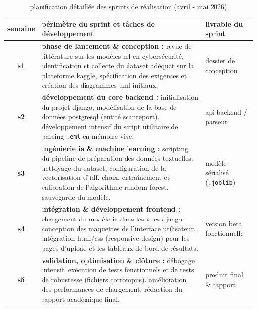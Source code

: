 \documentclass[12pt,a4paper]{report}
\begin{document}
\begin{table}[h]
\centering
\caption{planification détaillée des sprints de réalisation (avril - mai 2026)}
\begin{tabularx}{\textwidth}{|c|x|l|}
\hline
\textbf{semaine} & \textbf{périmètre du sprint et tâches de développement} & \textbf{livrable du sprint} \\ \hline
\textbf{s1} & \textbf{phase de lancement \& conception :} revue de littérature sur les modèles ml en cybersécurité, identification et collecte du dataset adéquat sur la plateforme kaggle, spécification des exigences et création des diagrammes uml initiaux. & dossier de conception \\ \hline
\textbf{s2} & \textbf{développement du core backend :} initialisation du projet django, modélisation de la base de données postgresql (entité scanreport). développement intensif du script utilitaire de parsing \texttt{.eml} en mémoire vive. & api backend / parseur \\ \hline
\textbf{s3} & \textbf{ingénierie ia \& machine learning :} scripting du pipeline de préparation des données textuelles. nettoyage du dataset, configuration de la vectorisation tf-idf. choix, entraînement et calibration de l'algorithme random forest. sauvegarde du modèle. & modèle sérialisé (\texttt{.joblib}) \\ \hline
\textbf{s4} & \textbf{intégration \& développement frontend :} chargement du modèle ia dans les vues django. conception des maquettes de l'interface utilisateur. intégration html/css (responsive design) pour les pages d'upload et les tableaux de bord de résultats. & version beta fonctionnelle \\ \hline
\textbf{s5} & \textbf{validation, optimisation \& clôture :} débogage intensif, exécution de tests fonctionnels et de tests de robustesse (fichiers corrompus). amélioration des performances de chargement. rédaction du rapport académique final. & produit final \& rapport \\ \hline
\end{tabularx}
\end{table}
\end{document}
